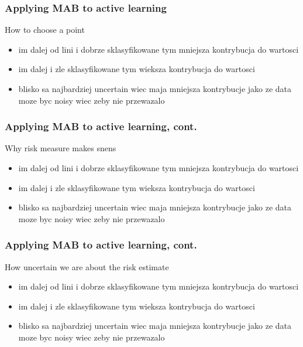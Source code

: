 \documentclass{beamer}
\begin{document}
  \begin{frame}
  \frametitle{Applying MAB to active learning}
  \begin{block}{How to choose a point}
    \begin{itemize}
      \item im dalej od lini i dobrze sklasyfikowane tym mniejsza kontrybucja do wartosci
      \item im dalej i zle sklasyfikowane tym wieksza kontrybucja do wartosci
      \item blisko sa najbardziej uncertain wiec maja mniejsza kontrybucje jako ze data moze byc noisy wiec zeby nie przewazalo
    \end{itemize}
  \end{block}
  \end{frame}
  \begin{frame}
  \frametitle{Applying MAB to active learning, cont.}
  \begin{block}{Why risk measure makes snens}
    \begin{itemize}
      \item im dalej od lini i dobrze sklasyfikowane tym mniejsza kontrybucja do wartosci
      \item im dalej i zle sklasyfikowane tym wieksza kontrybucja do wartosci
      \item blisko sa najbardziej uncertain wiec maja mniejsza kontrybucje jako ze data moze byc noisy wiec zeby nie przewazalo
    \end{itemize}
  \end{block}
  \end{frame}
  \begin{frame}
  \frametitle{Applying MAB to active learning, cont.}
  \begin{block}{How uncertain we are about the risk estimate}
    \begin{itemize}
      \item im dalej od lini i dobrze sklasyfikowane tym mniejsza kontrybucja do wartosci
      \item im dalej i zle sklasyfikowane tym wieksza kontrybucja do wartosci
      \item blisko sa najbardziej uncertain wiec maja mniejsza kontrybucje jako ze data moze byc noisy wiec zeby nie przewazalo
    \end{itemize}
  \end{block}
  \end{frame}
\end{document}
